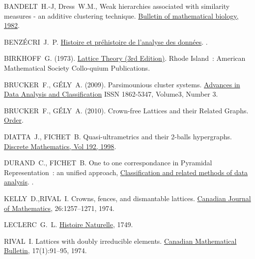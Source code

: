\documentclass[a4paper]{report}
\begin{document}

\begin{thebibliography}{9}
BANDELT~H.-J, Dress~W.M.,
\newblock Weak hierarchies associated with similarity measures - an additive clustering technique.
\newblock \underline{Bulletin of mathematical biology, 1982}.


BENZÉCRI~J.~P.
\newblock \underline{Histoire et préhistoire de l'analyse des données}.
.

BIRKHOFF~G. (1973).
\newblock  \underline{Lattice Theory (3rd Edition)}.
\newblock Rhode Island~: American Mathematical Society Collo-quium Publications.

BRUCKER~F., GÉLY~A. (2009).
\newblock Parsimounious cluster systems.
\newblock \underline{Advances in Data Analysis and Classification} ISSN 1862-5347, Volume3, Number 3.

BRUCKER~F., GÉLY~A. (2010).
\newblock Crown-free Lattices and their Related Graphs.
\newblock \underline{Order}.

DIATTA~J., FICHET~B.
\newblock Quasi-ultrametrics and their 2-balls hypergraphs.
\newblock \underline{Discrete Mathematics, Vol 192, 1998}.

DURAND~C., FICHET~B.
\newblock One to one correspondance in Pyramidal Representation~: an unified approach, \underline{Classification and related methods of data analysis}.
.

KELLY~D.,RIVAL~I.
\newblock Crowns, fences, and dismantable lattices.
\newblock \underline{Canadian Journal of Mathematics}, 26:1257--1271, 1974.

LECLERC~G.~L.
\newblock \underline{Histoire Naturelle}, 1749.

RIVAL~I.
\newblock Lattices with doubly irreducible elements.
\newblock \underline{Canadian Mathematical Bulletin}, 17(1):91--95, 1974.

\end{thebibliography}
\end{document}
